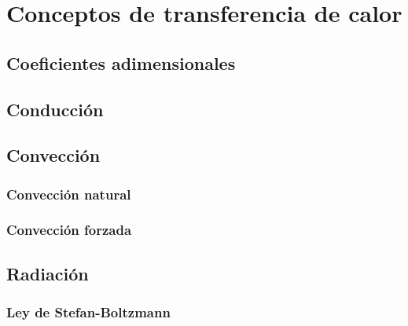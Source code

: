 \section{Conceptos de transferencia de calor}

\subsection{Coeficientes adimensionales}

\subsection{Conducción}

\subsection{Convección}

\subsubsection{Convección natural}

\subsubsection{Convección forzada}

\subsection{Radiación}

\subsubsection{Ley de Stefan-Boltzmann}



